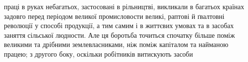 праці в руках небагатьох, застосовані в рільництві, викликали
в багатьох країнах задовго перед періодом великої промисловости
великі, раптові й ґвалтовні революції у способі продукції, а тим
самим і в життєвих умовах та в засобах заняття сільської людности.
Але ця боротьба точиться спочатку більше поміж великими
та дрібними землевласниками, ніж поміж капіталом та найманою
працею; з другого боку, оскільки робітників витискують засоби
\parbreak{}  %
